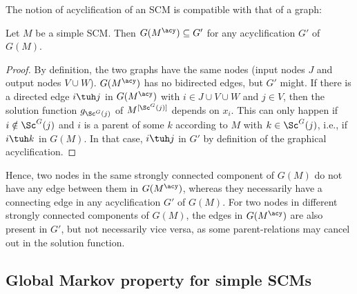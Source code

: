 The notion of acyclification of an SCM is compatible with that of a graph:
\begin{Prp}\label{prp:acyclifications_compatible}
  Let $M$ be a simple SCM.
  Then $G(M^\acy) \subseteq G'$ for any acyclification $G'$ of $G(M)$.
\end{Prp}
\begin{proof}
  By definition, the two graphs have the same nodes (input nodes $J$ and output nodes
  $V \cup W$). $G(M^\acy)$ has no bidirected edges, but $G'$ might. If there is a 
  directed edge $i \tuh j$ in $G(M^\acy)$ with $i \in J \cup V \cup W$ and $j \in V$, then
  the solution function $g_{\Sc^G(j)}$ of $M^{[\Sc^G(j)]}$ depends on $x_i$. 
  This can only happen if
  $i \notin \Sc^G(j)$ and $i$ is a parent of some $k$ according to $M$ with $k \in \Sc^G(j)$,
  i.e., if $i \tuh k$ in $G(M)$. In that case, $i \tuh j$ in $G'$ by definition of
  the graphical acyclification.
\end{proof}
Hence, two nodes in the same strongly connected component of $G(M)$ do not have any edge between them
in $G(M^\acy)$, whereas they necessarily have a connecting edge in any acyclification $G'$ of $G(M)$.
For two nodes in different strongly connected components of $G(M)$, the edges in $G(M^\acy)$ are also
present in $G'$, but not necessarily vice versa, as some parent-relations may cancel out in the solution function.

\subsection{Global Markov property for simple SCMs}

